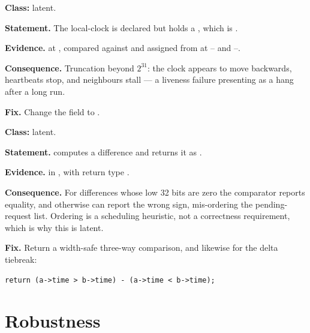 \begin{deviation}\label{dev:clock-width}
\textbf{Class:} latent.

\textbf{Statement.} The \gls{local-clock} is declared  but holds a
, which is .

\textbf{Evidence.}  at
, compared against and assigned from
 at -- and
--.

\textbf{Consequence.} Truncation beyond $2^{31}$: the clock appears to move
backwards, \glspl{heartbeat} stop, and neighbours stall --- a liveness failure
presenting as a hang after a long run.

\textbf{Fix.} Change the field to .
\end{deviation}

\begin{deviation}\label{dev:cmp-truncation}
\textbf{Class:} latent.

\textbf{Statement.}  computes a
 difference and returns it as .

\textbf{Evidence.}  in
, with return type .

\textbf{Consequence.} For differences whose low 32 bits are zero the
comparator reports equality, and otherwise can report the wrong sign,
mis-ordering the pending-request list. Ordering is a scheduling heuristic, not
a correctness requirement, which is why this is latent.

\textbf{Fix.} Return a width-safe three-way comparison, and likewise for the
\gls{delta} tiebreak:
\begin{lstlisting}
return (a->time > b->time) - (a->time < b->time);
\end{lstlisting}
\end{deviation}

\section{Robustness}

